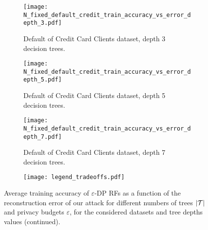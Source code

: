 \begin{figure*}[t!] %
\begin{subfigure}{0.5\textwidth}
    \centering
    \texttt{[image: N\_fixed\_default\_credit\_train\_accuracy\_vs\_error\_depth\_3.pdf]}
    \caption{Default of Credit Card Clients dataset, depth 3 decision trees.}
    \label{fig:results_tradeoffs_acc_reconstr_default_credit_depth_3}
\end{subfigure}
\hfill
\begin{subfigure}{0.5\textwidth}
    \centering
    \texttt{[image: N\_fixed\_default\_credit\_train\_accuracy\_vs\_error\_depth\_5.pdf]}
    \caption{Default of Credit Card Clients dataset, depth 5 decision trees.}
    \label{fig:results_tradeoffs_acc_reconstr_default_credit_depth_5}
\end{subfigure}

\vspace{10pt}

\hfill
\begin{subfigure}{0.5\textwidth}
    \centering
    \texttt{[image: N\_fixed\_default\_credit\_train\_accuracy\_vs\_error\_depth\_7.pdf]}
    \caption{Default of Credit Card Clients dataset, depth 7 decision trees.}
    \label{fig:results_tradeoffs_acc_reconstr_default_credit_depth_7}
\end{subfigure}
\hfill
\vspace{10pt}

\begin{subfigure}{\textwidth}
    \centering
    \texttt{[image: legend\_tradeoffs.pdf]}
\end{subfigure}

\caption{Average training accuracy of $\varepsilon$-DP RFs as a function of the reconstruction error of our attack for different numbers of trees $\vert \mathcal{T} \rvert$ and privacy budgets $\varepsilon$, for the considered datasets and tree depths values (continued).}\label{fig:results_all_tradeoffs_predictive_perf_vs_recontr_error_bis}
\end{figure*}